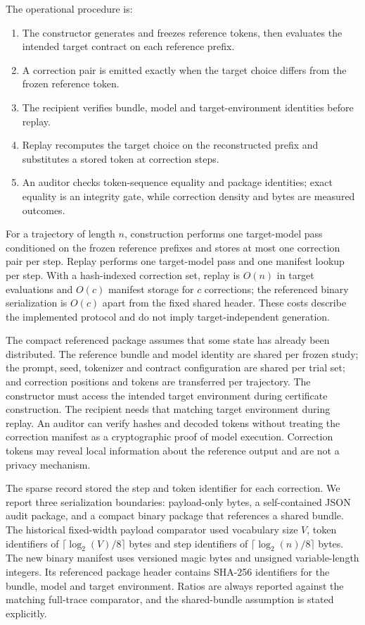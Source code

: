 \documentclass{nature}
\begin{document}
\begin{methods}
The operational procedure is:

\begin{enumerate}
\item The constructor generates and freezes reference tokens, then evaluates the intended target contract on each reference prefix.
\item A correction pair is emitted exactly when the target choice differs from the frozen reference token.
\item The recipient verifies bundle, model and target-environment identities before replay.
\item Replay recomputes the target choice on the reconstructed prefix and substitutes a stored token at correction steps.
\item An auditor checks token-sequence equality and package identities; exact equality is an integrity gate, while correction density and bytes are measured outcomes.
\end{enumerate}
For a trajectory of length \(n\), construction performs one target-model pass conditioned on the frozen reference prefixes and stores at most one correction pair per step. Replay performs one target-model pass and one manifest lookup per step. With a hash-indexed correction set, replay is \(O(n)\) in target evaluations and \(O(c)\) manifest storage for \(c\) corrections; the referenced binary serialization is \(O(c)\) apart from the fixed shared header. These costs describe the implemented protocol and do not imply target-independent generation.

The compact referenced package assumes that some state has already been distributed. The reference bundle and model identity are shared per frozen study; the prompt, seed, tokenizer and contract configuration are shared per trial set; and correction positions and tokens are transferred per trajectory. The constructor must access the intended target environment during certificate construction. The recipient needs that matching target environment during replay. An auditor can verify hashes and decoded tokens without treating the correction manifest as a cryptographic proof of model execution. Correction tokens may reveal local information about the reference output and are not a privacy mechanism.

The sparse record stored the step and token identifier for each correction. We report three serialization boundaries: payload-only bytes, a self-contained JSON audit package, and a compact binary package that references a shared bundle. The historical fixed-width payload comparator used vocabulary size \(V\), token identifiers of \(\lceil\log_2(V)/8\rceil\) bytes and step identifiers of \(\lceil\log_2(n)/8\rceil\) bytes. The new binary manifest uses versioned magic bytes and unsigned variable-length integers. Its referenced package header contains SHA-256 identifiers for the bundle, model and target environment. Ratios are always reported against the matching full-trace comparator, and the shared-bundle assumption is stated explicitly.


\end{methods}
\end{document}
